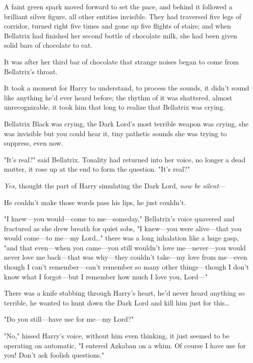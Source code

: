 
\lettrine{A}{} faint green 
spark moved forward to set the pace, and behind it followed a brilliant silver 
figure, all other entities invisible. They had traversed five legs of corridor, 
turned right five times and gone up five flights of stairs; and when Bellatrix 
had finished her second bottle of chocolate milk, she had been given solid bars 
of chocolate to eat.

It was after her third bar of chocolate that strange noises began to come from 
Bellatrix's throat.

It took a moment for Harry to understand, to process the sounds, it didn't 
sound like anything he'd ever heard before; the rhythm of it was shattered, 
almost unrecognizable, it took him that long to realize that Bellatrix was 
crying.

Bellatrix Black was crying, the Dark Lord's most terrible weapon was crying, 
she was invisible but you could hear it, tiny pathetic sounds she was trying to 
suppress, even now.

"It's real?" said Bellatrix. Tonality had returned into her voice, no longer a 
dead mutter, it rose up at the end to form the question. "It's real?"

\emph{Yes,} thought the part of Harry simulating the Dark Lord, \emph{now be 
silent}---

He couldn't make those words pass his lips, he just couldn't.

"I knew---you would---come to me---someday," Bellatrix's voice quavered and 
fractured as she drew breath for quiet sobs, "I knew---you were alive---that 
you would come---to me---my Lord{\ldots}" there was a long inhalation like a 
huge gasp, "and that even---when you came---you still wouldn't love 
me---never---you would never love me back---that was why---they couldn't 
take---my love from me---even though I can't remember---can't remember so many 
other things---though I don't know what I forgot---but I remember how much I 
love you, Lord---"

There was a knife stabbing through Harry's heart, he'd never heard anything so 
terrible, he wanted to hunt down the Dark Lord and kill him just for 
this{\ldots}

"Do you still---have use for me---my Lord?"

"No," hissed Harry's voice, without him even thinking, it just seemed to be 
operating on automatic, "I entered Azkaban on a whim. Of course I have use for 
you! Don't ask foolish questions."

